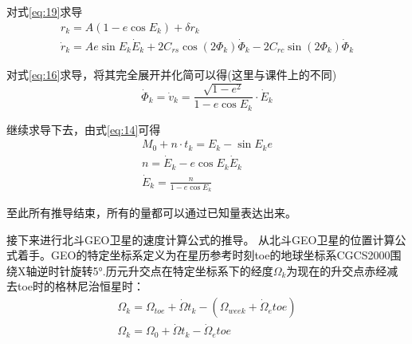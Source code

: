 \documentclass{ctexart}
\begin{document}
对式\eqref{eq:19}求导
\begin{equation}
\begin{gathered}
r_k=A(1-e\cos E_k)+\delta r_k\\
\dot{r}_k=Ae\sin E_k\dot{E}_k+2C_{rs}\cos(2\Phi_k)\dot{\Phi}_k-2C_{rc}\sin(2\Phi_k)\dot{\Phi}_k
\end{gathered}
\end{equation}

对式\eqref{eq:16}求导，将其完全展开并化简可以得(这里与课件上的不同)
\begin{equation}
\dot{\Phi}_k=\dot{v}_k=\frac{\sqrt{1-e^2}}{1-e\cos E_k}\cdot \dot{E}_k
\end{equation}

继续求导下去，由式\eqref{eq:14}可得
\begin{equation}
\begin{gathered}
M_0+n\cdot t_k=E_k-\sin E_k e\\
n=\dot{E}_k-e\cos E_k \dot{E}_k\\
\dot{E}_k=\frac{n}{1-e\cos E_k}
\end{gathered}
\end{equation}

至此所有推导结束，所有的量都可以通过已知量表达出来。

接下来进行北斗GEO卫星的速度计算公式的推导。
从北斗GEO卫星的位置计算公式着手。GEO的特定坐标系定义为在星历参考时刻toe的地球坐标系CGCS2000围绕X轴逆时针旋转5°.历元升交点在特定坐标系下的经度$\Omega_k$为现在的升交点赤经减去toe时的格林尼治恒星时：
\begin{equation}
\begin{gathered}
\Omega_k=\Omega_{toe}+\dot{\Omega}t_k-(\Omega_{week}+\dot{\Omega}_etoe)\\
\Omega_k=\Omega_0+\dot{\Omega}t_k-\dot{\Omega}_etoe
\end{gathered}
\end{equation}
\end{document}
